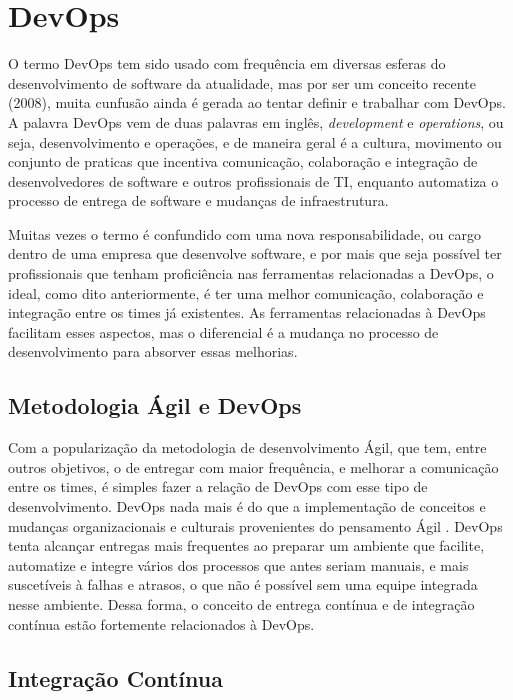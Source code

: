 \section{DevOps}
\label{sec:devops}

O termo DevOps tem sido usado com frequência em diversas esferas do
desenvolvimento de software da atualidade, mas por ser um conceito recente
(2008), muita cunfusão ainda é gerada ao tentar definir e trabalhar com DevOps.
A palavra DevOps vem de duas palavras em inglês, \textit{development} e \textit{operations},
ou seja, desenvolvimento e operações, e de maneira geral é a cultura, movimento
ou conjunto de praticas que incentiva comunicação, colaboração e integração de
desenvolvedores de software e outros profissionais de TI, enquanto automatiza o
processo de entrega de software e mudanças de infraestrutura. ~\cite{loukides2012devops}~\cite{erich2014mapping}

Muitas vezes o termo é confundido com uma nova responsabilidade, ou cargo
dentro de uma empresa que desenvolve software, e por mais que seja possível
ter profissionais que tenham proficiência nas ferramentas relacionadas a
DevOps, o ideal, como dito anteriormente, é ter uma melhor comunicação,
colaboração e integração entre os times já existentes. As ferramentas
relacionadas à DevOps facilitam esses aspectos, mas o diferencial é a
mudança no processo de desenvolvimento para absorver essas melhorias.

\subsection{Metodologia Ágil e DevOps}

Com a popularização da metodologia de desenvolvimento Ágil, que tem, entre outros
objetivos, o de entregar com maior frequência, e melhorar a comunicação entre os
times, é simples fazer a relação de DevOps com esse tipo de desenvolvimento.
DevOps nada mais é do que a implementação de conceitos e mudanças organizacionais
e culturais provenientes do pensamento Ágil \cite{scott2014}. DevOps tenta
alcançar entregas mais frequentes ao preparar um ambiente que facilite,
automatize e integre vários dos processos que antes seriam manuais, e mais
suscetíveis à falhas e atrasos, o que não é possível sem uma equipe integrada
nesse ambiente. Dessa forma, o conceito de entrega contínua e de integração
contínua estão fortemente relacionados à DevOps.

\subsection{Integração Contínua}


